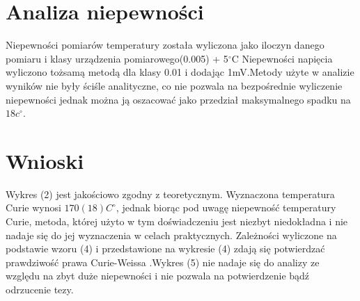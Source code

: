 \documentclass[a4paper,10pt]{article}
\begin{document}
\section{Analiza niepewności}
Niepewności pomiarów temperatury została wyliczona jako iloczyn danego pomiaru i klasy urządzenia pomiarowego(0.005) + 5$^\circ$C
Niepewności napięcia wyliczono tożsamą metodą dla klasy 0.01 i dodając 1mV.Metody użyte w analizie wyników nie były ściśle analityczne, co nie pozwala na bezpośrednie wyliczenie niepewności jednak można ją oszacować jako przedział maksymalnego spadku na $18c^\circ$.

\section{Wnioski}
Wykres (2) jest jakościowo zgodny z teoretycznym. Wyznaczona temperatura Curie wynosi $170(18)C^\circ$, jednak biorąc pod uwagę niepewność temperatury Curie, metoda, której użyto w tym doświadczeniu jest niezbyt niedokładna i nie nadaje się do jej wyznaczenia w celach praktycznych. Zależności wyliczone na podstawie wzoru (4) i przedstawione na wykresie (4) zdają się potwierdzać prawdziwość prawa Curie-Weissa .Wykres (5) nie nadaje się do analizy ze względu na zbyt duże niepewności i nie pozwala na potwierdzenie bądź odrzucenie tezy.
\end{document}
